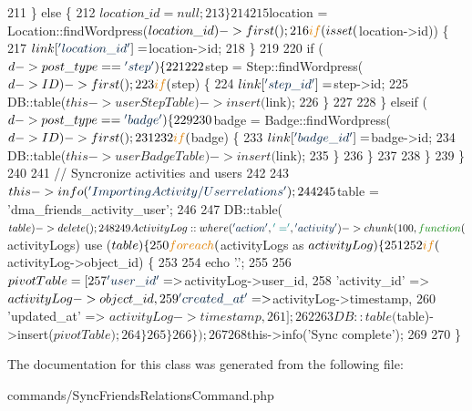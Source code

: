 \begin{DoxyCode}
211                 \} \textcolor{keywordflow}{else} \{
212                     $location\_id = null;
213                 \}
214 
215                 $location = Location::findWordpress($location\_id)->first();
216                 \textcolor{keywordflow}{if} (isset($location->id)) \{
217                     $link[\textcolor{stringliteral}{'location\_id'}] = $location->id;
218                 \}
219 
220                 \textcolor{keywordflow}{if} ($d->post\_type == \textcolor{stringliteral}{'step'}) \{
221 
222                     $step = Step::findWordpress($d->ID)->first();
223                     \textcolor{keywordflow}{if} ($step) \{
224                         $link[\textcolor{stringliteral}{'step\_id'}] = $step->id;
225                         DB::table($this->userStepTable)->insert($link);
226                     \}
227 
228                 \} elseif ($d->post\_type == \textcolor{stringliteral}{'badge'}) \{
229 
230                     $badge = Badge::findWordpress($d->ID)->first();
231 
232                     \textcolor{keywordflow}{if} ($badge) \{
233                         $link[\textcolor{stringliteral}{'badge\_id'}] = $badge->id;
234                         DB::table($this->userBadgeTable)->insert($link);
235                     \}
236                 \}
237 
238             \}
239         \}
240 
241         \textcolor{comment}{// Syncronize activities and users}
242 
243         $this->info(\textcolor{stringliteral}{'Importing Activity/User relations'});
244         
245         $table = \textcolor{stringliteral}{'dma\_friends\_activity\_user'};
246 
247         DB::table($table)->delete();
248 
249         ActivityLog::where(\textcolor{stringliteral}{'action'}, \textcolor{charliteral}{'='}, \textcolor{stringliteral}{'activity'})->chunk(100, \textcolor{keyword}{function}($activityLogs) use ($table) \{
250             \textcolor{keywordflow}{foreach} ($activityLogs as $activityLog) \{
251 
252                 \textcolor{keywordflow}{if} ($activityLog->object\_id) \{
253 
254                     echo \textcolor{stringliteral}{'.'};
255 
256                     $pivotTable = [
257                         \textcolor{stringliteral}{'user\_id'}       => $activityLog->user\_id,
258                         \textcolor{stringliteral}{'activity\_id'}   => $activityLog->object\_id,
259                         \textcolor{stringliteral}{'created\_at'}    => $activityLog->timestamp,
260                         \textcolor{stringliteral}{'updated\_at'}    => $activityLog->timestamp,
261                     ];
262 
263                     DB::table($table)->insert($pivotTable);
264                 \}
265             \}
266         \});
267 
268         $this->info(\textcolor{stringliteral}{'Sync complete'});
269 
270     \}
\end{DoxyCode}


The documentation for this class was generated from the following file\+:\begin{DoxyCompactItemize}
\item 
commands/Sync\+Friends\+Relations\+Command.\+php\end{DoxyCompactItemize}
